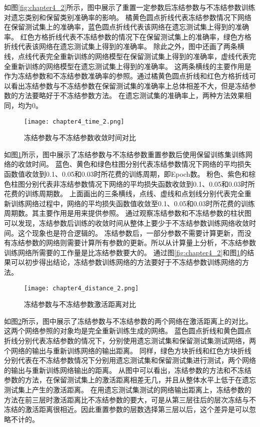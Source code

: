 如图\ref{fig:chapter4_2}所示，图中展示了重置一定参数后冻结参数与不冻结参数训练对遗忘类别和保留类别准确率的影响。
橘黄色圆点折线代表冻结参数情况下网络在保留测试集上的准确率，蓝色圆点折线代表该网络在遗忘测试集上得到的准确率。
红色方格折线代表不冻结参数的情况下在保留测试集上的准确率，绿色方格折线代表该网络在遗忘测试集上得到的准确率。
除此之外，图中还画了两条横线，点线代表完全重新训练的网络模型在保留测试集上得到的准确率，虚线代表完全重新训练的网络模型在遗忘测试集上得到的准确率。
这两条横线的主要作用是作为冻结参数和不冻结参数准确率的参照。通过橘黄色圆点折线和红色方格折线可以看出冻结参数与不冻结参数在保留测试集的准确率上总体相差不大，但是冻结参数的方法要略好于不冻结参数方法。
在遗忘测试集的准确率上，两种方法效果相同，均为0。
\begin{figure}
    \centering
    \texttt{[image: chapter4\_time\_2.png]}
    \caption{冻结参数与不冻结参数收敛时间对比}
    \label{fig:chapter4_time_2}
\end{figure}

如图\ref{fig:chapter4_time_2}所示，图中展示了冻结参数与不冻结参数重置参数后使用保留训练集训练网络的收敛时间。
蓝色、黄色和绿色柱图分别代表冻结参数情况下网络的平均损失函数值收敛到0.1、0.05和0.03时所花费的训练周期，即Epoch数。
粉色、紫色和棕色柱图分别代表非冻结参数情况下网络的平均损失函数收敛到0.1、0.05和0.03时所花费的训练周期数。
上面画出的三条横线，点线、虚线和点划线分别代表完全重新训练网络过程中，网络的平均损失函数值收敛至0.1、0.05和0.03时所花费的训练周期数。其主要作用是用来提供参照。
通过观察冻结参数和不冻结参数的柱状图可以发现，冻结参数后训练的收敛时间从整体上要少于不冻结参数训练网络收敛时间。这个现象也是符合逻辑的。
冻结参数后，一部分参数不需要计算更新，而没有冻结参数的网络则需要计算所有参数的更新。所以从计算量上分析，不冻结参数训练网络所需要的工作量是比冻结参数要大的。
通过图\ref{fig:chapter4_2}和图\ref{fig:chapter4_time_2}的结果可以初步得出结论，冻结参数训练网络的方法要好于不冻结参数训练网络的方法。
\begin{figure}
    \centering
    \texttt{[image: chapter4\_distance\_2.png]}
    \caption{冻结参数与不冻结参数激活距离对比}
    \label{fig:chapter4_distance_2}
\end{figure}

如图\ref{fig:chapter4_distance_2}所示，图中展示了冻结参数与不冻结参数的两个网络在激活距离上的对比。这两个网络参照的对象均是完全重新训练生成的网络。
蓝色圆点折线和黄色圆点折线分别代表冻结参数的情况下，分别使用遗忘测试集和保留测试集测试网络，两个网络的输出与重新训练网络的输出距离。
同样，绿色方块折线和红色方块折线分别代表在不冻结参数情况下分别用遗忘测试集和保留测试集进行测试，两个网络的输出与重新训练网络输出的距离。
从图中可以看出，冻结参数的方法和不冻结参数的方法，在保留测试集上的激活距离相差无几，并且从整体水平上低于在遗忘测试集上产生的激活距离。
在用遗忘测试集测试的网络输出距离上，冻结参数的方法在前三层时激活距离比不冻结参数的要大，可是从第三层往后的层次冻结与不冻结的激活距离很相近。因此重置参数的层数选择第三层以后，这个差异是可以忽略不计的。

